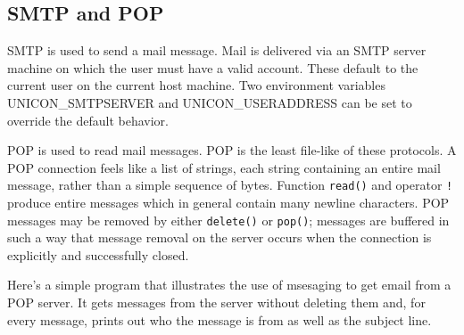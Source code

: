 \subsection*{SMTP and POP}

SMTP is used to send a mail message. Mail is delivered via
an SMTP server machine on which the user must have a valid account.
These default to the current user on the current host machine. Two
environment variables UNICON\_SMTPSERVER and UNICON\_USERADDRESS can be
set to override the default behavior.

POP is used to read mail messages. POP is the least file-like
of these protocols. A POP connection feels like a list of strings, each
string containing an entire mail message, rather than a simple sequence
of bytes. Function \texttt{read()} and operator \texttt{!} produce
entire messages which in general contain many newline characters. POP
messages may be removed by either \texttt{delete()} or \texttt{pop()};
messages are buffered in such a way that message removal on the server
occurs when the connection is explicitly and successfully closed.

Here's a simple program that illustrates the use of
msesaging to get email from a POP server. It gets messages from the
server without deleting them and, for every message, prints out who the
message is from as well as the subject line.


